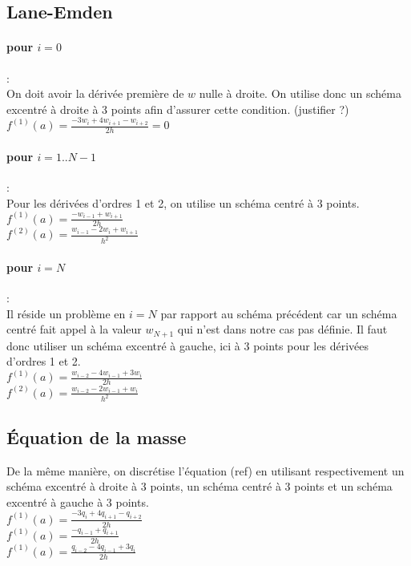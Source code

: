 \documentclass[a4paper,10pt]{article}
\begin{document}
\subsection{Lane-Emden}
\paragraph{pour $i=0$}: \\
On doit avoir la dérivée première de $w$ nulle à droite. On utilise donc un schéma excentré à droite à 3 points afin d'assurer cette condition. (justifier ?)\\
$f^{(1)} (a) = \frac{-3 w_i + 4 w_{i+1} - w_{i+2}}{2 h}=0$

\paragraph{pour $i=1..N-1$}: \\
Pour les dérivées d'ordres 1 et 2, on utilise un schéma centré à 3 points.\\
$f^{(1)} (a) = \frac{-w_{i-1}+w_{i+1}}{2 h}$\\
$f^{(2)} (a) = \frac{w_{i-1}-2 w_i+w_{i+1}}{h^2}$

\paragraph{pour $i=N$}: \\
Il réside un problème en $i=N$ par rapport au schéma précédent car un schéma centré fait appel à la valeur $w_{N+1}$ qui n'est dans notre cas pas définie. Il faut donc utiliser un schéma excentré à gauche, ici à 3 points pour les dérivées d'ordres 1 et 2.\\
$f^{(1)} (a) = \frac{w_{i-2}-4 w_{i-1}+3 w_i}{2 h}$\\
$f^{(2)} (a) = \frac{w_{i-2}-2 w_{i-1}+w_i}{h^2}$


\subsection{Équation de la masse}
De la même manière, on discrétise l'équation (ref) en utilisant respectivement un schéma excentré à droite à 3 points, un schéma centré à 3 points et un schéma excentré à gauche à 3 points.\\
$f^{(1)} (a) = \frac{-3 q_i + 4 q_{i+1} - q_{i+2}}{2 h}$\\
$f^{(1)} (a) = \frac{-q_{i-1}+q_{i+1}}{2 h}$\\
$f^{(1)} (a) = \frac{q_{i-2}-4 q_{i-1}+3 q_i}{2 h}$\\
\end{document}
